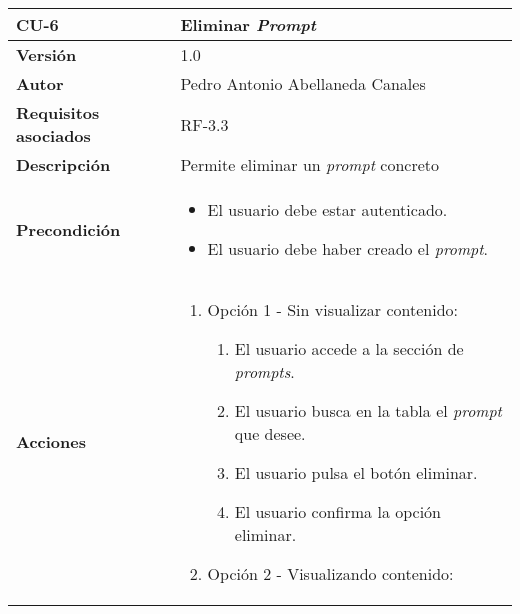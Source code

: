 \begin{table}[p]
	\centering
	\begin{tabularx}{\linewidth}{ p{} p{} }
		\toprule
		\textbf{CU-6}    & \textbf{Eliminar \textit{Prompt}} \\
		\midrule
		\textbf{Versión}              & 1.0    \\
		\textbf{Autor}                & Pedro Antonio Abellaneda Canales \\
		\textbf{Requisitos asociados} & RF-3.3 \\
		\textbf{Descripción}          & Permite eliminar un \textit{prompt} concreto \\
		\textbf{Precondición}         
                                    & 
                                    \begin{itemize}
                                        \tightlist
                                        \item El usuario debe estar autenticado.
                                        \item  El usuario debe haber creado el \textit{prompt}.
                                    \end{itemize}  
                                    \\
		\textbf{Acciones}             &
                                    \begin{enumerate}
                                        \tightlist
                                        \item Opción 1 - Sin visualizar contenido:
                            		\begin{enumerate}
                            			\def\labelenumi{\arabic{enumi}.}
                            			\tightlist
                            			\item El usuario accede a la sección de \textit{prompts}.
                                        \item El usuario busca en la tabla el \textit{prompt} que desee.
                            			\item El usuario pulsa el botón eliminar.
                                        \item El usuario confirma la opción eliminar.
                            		\end{enumerate}
                                        \item Opción 2 - Visualizando contenido:
                            		\begin{enumerate}

\end{enumerate}
\end{enumerate}
\end{tabularx}
\end{table}
